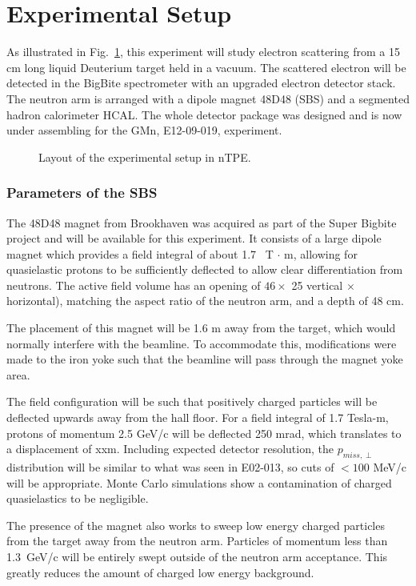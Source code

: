 \section{Experimental Setup}
%
\label{sec:expsetup}

As illustrated in Fig.~\ref{pic:expsetup}, this experiment will study electron scattering from a 15 cm long 
liquid Deuterium target held in a vacuum.
The scattered electron will be detected in the BigBite spectrometer with an upgraded electron detector stack. 
The neutron arm is arranged with a dipole magnet 48D48 (SBS) and a segmented hadron calorimeter HCAL.  
The whole detector package was designed and is now under assembling for the GMn, E12-09-019, experiment. 

\begin{figure}[bh]
	\caption{Layout of the experimental setup in nTPE.}	
\label{pic:expsetup}
\end{figure}

\subsubsection{Parameters of the SBS}

The 48D48 magnet from Brookhaven was acquired as part of the Super Bigbite project and will be available for this experiment.  
It consists of a large dipole magnet which provides a field integral of about 1.7~ T $\cdot$ m, allowing for quasielastic 
protons to be sufficiently deflected to allow clear differentiation from neutrons.  
The active field volume has an opening of $46 \times$ 25 vertical $\times$ horizontal), 
matching the aspect ratio of the neutron arm, and a depth of 48 cm.

The placement of this magnet will be 1.6 m away from the target, which would normally interfere with the beamline.  
To accommodate this, modifications were made to the iron yoke such that the beamline will pass through the magnet yoke area.

The field configuration will be such that positively charged particles will be deflected upwards away from the hall floor.  
For a field integral of 1.7 Tesla-m, protons of momentum 2.5 GeV/c will be deflected 250 mrad,
 which translates to a displacement of xxm.  
 Including expected detector resolution,  the $p_{miss,\perp}$ distribution will be similar to 
 what was seen in E02-013, so cuts of  $< 100$ MeV/c will be appropriate.  
Monte Carlo simulations show a contamination of charged quasielastics to be negligible.

The presence of the magnet also works to sweep low energy charged particles from the target away from the neutron arm.  
Particles of momentum less than 1.3~{GeV/c} will be entirely swept outside of the neutron arm acceptance.  
This greatly reduces the amount of charged low energy background.
%

